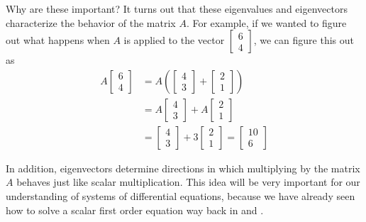 \documentclass{ximera}
\begin{document}
Why are these important? It turns out that these eigenvalues and eigenvectors characterize the behavior of the matrix $A$. For example, if we wanted to figure out what happens when $A$ is applied to the vector $\begin{bmatrix} 6 \\ 4 \end{bmatrix}$, we can figure this out as
\[ 
    \begin{split}
        A
        \begin{bmatrix} 
            6 \\ 
            4 
        \end{bmatrix} 
        &= A
        \left(
        \begin{bmatrix} 
            4 \\ 
            3 
        \end{bmatrix} 
        + 
        \begin{bmatrix} 
            2 \\ 
            1 
        \end{bmatrix} 
        \right) \\
        &= A
        \begin{bmatrix} 
            4 \\ 
            3 
        \end{bmatrix}
         + A
        \begin{bmatrix}
            2 \\ 
            1 
        \end{bmatrix} \\
        &= 
        \begin{bmatrix}
            4 \\ 
            3 
        \end{bmatrix} 
        + 3
        \begin{bmatrix}
            2 \\ 
            1 
        \end{bmatrix} 
        = 
        \begin{bmatrix} 
            10 \\ 
            6 
        \end{bmatrix}
    \end{split}
\]

In addition, eigenvectors determine directions in which multiplying by the matrix $A$ behaves just like scalar multiplication. This idea will be very important for our understanding of systems of differential equations, because we have already seen how to solve a scalar first order equation way back in  and . 
\end{document}
